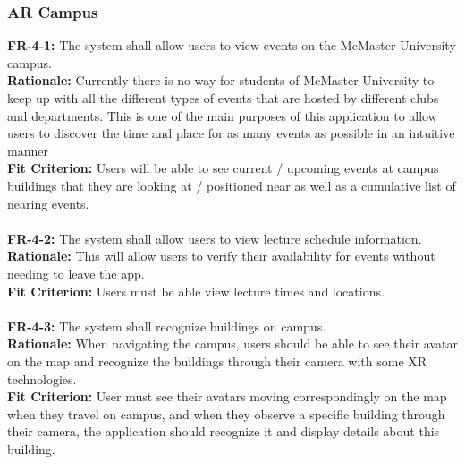 \documentclass[12pt]{article}
\begin{document}
\subsubsection{AR Campus}
    \textbf{FR-4-1:} The system shall allow users to view events on the McMaster University campus.\\
    \textbf{Rationale:} Currently there is no way for students of McMaster University to keep up with all the different types of events that are hosted by different clubs and departments. This is one of the main purposes of this application to allow users to discover the time and place for as many events as possible in an intuitive manner\\
    \textbf{Fit Criterion:} Users will be able to see current / upcoming events at campus buildings that they are looking at / positioned near as well as a cumulative list of nearing events.\\\\
    \textbf{FR-4-2:} The system shall allow users to view lecture schedule information.\\
    \textbf{Rationale:} This will allow users to verify their availability for events without needing to leave the app.\\
    \textbf{Fit Criterion:} Users must be able view lecture times and locations. \\\\
    \textbf{FR-4-3:} The system shall recognize buildings on campus.\\
    \textbf{Rationale:} When navigating the campus, users should be able to see their avatar on the map and recognize the buildings through their camera with some XR technologies.\\
    \textbf{Fit Criterion:} User must see their avatars moving correspondingly on the map when they travel on campus, and when they observe a specific building through their camera, the application should recognize it and display details about this building.\\
\end{document}
